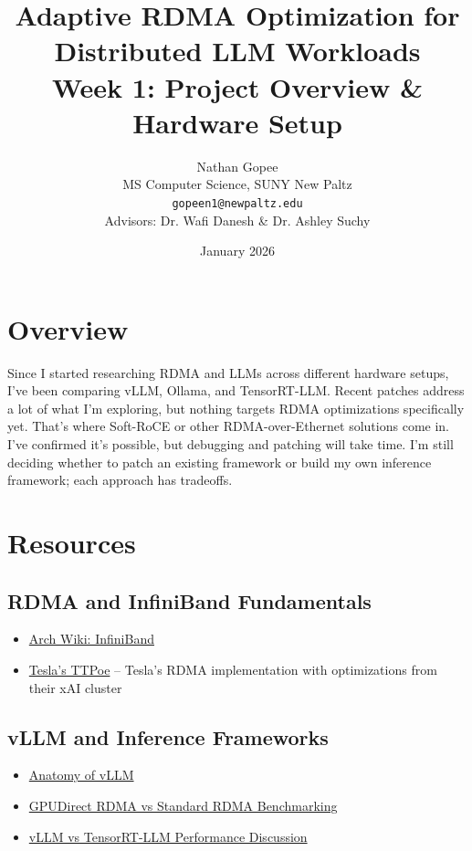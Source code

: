 \documentclass[10pt,letterpaper]{article}
\title{\textbf{Adaptive RDMA Optimization for Distributed LLM Workloads}\\[0.5em]
\large Week 1: Project Overview \& Hardware Setup}
\author{Nathan Gopee\\
MS Computer Science, SUNY New Paltz\\
\texttt{gopeen1@newpaltz.edu}\\[1em]
\small Advisors: Dr. Wafi Danesh \& Dr. Ashley Suchy}
\date{January 2026}
\begin{document}
\maketitle

\section{Overview}

Since I started researching RDMA and LLMs across different hardware setups, I've been comparing vLLM, Ollama, and TensorRT-LLM. Recent patches address a lot of what I'm exploring, but nothing targets RDMA optimizations specifically yet. That's where Soft-RoCE or other RDMA-over-Ethernet solutions come in. I've confirmed it's possible, but debugging and patching will take time. I'm still deciding whether to patch an existing framework or build my own inference framework; each approach has tradeoffs.

\section{Resources}

\subsection{RDMA and InfiniBand Fundamentals}
\begin{itemize}[noitemsep]
    \item \href{https://wiki.archlinux.org/title/InfiniBand}{Arch Wiki: InfiniBand}
    \item \href{https://github.com/teslamotors/ttpoe}{Tesla's TTPoe} -- Tesla's RDMA implementation with optimizations from their xAI cluster
\end{itemize}

\subsection{vLLM and Inference Frameworks}
\begin{itemize}[noitemsep]
    \item \href{https://blog.vllm.ai/2025/09/05/anatomy-of-vllm.html}{Anatomy of vLLM}
    \item \href{https://discuss.vllm.ai/t/vllm-benchmarking-why-is-gpudirect-rdma-not-outperforming-standard-rdma-in-a-pipeline-parallel-setup/1377}{GPUDirect RDMA vs Standard RDMA Benchmarking}
    \item \href{https://www.reddit.com/r/LocalLLaMA/comments/1oyawkl/why_is_vllm_outperforming_tensorrtllm_nvidias/}{vLLM vs TensorRT-LLM Performance Discussion}
\end{itemize}
\end{document}
